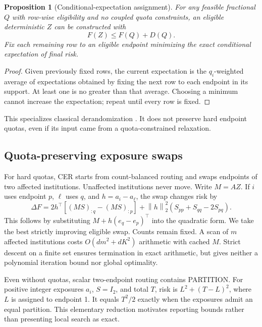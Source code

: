 \documentclass[11pt]{article}
\newtheorem{proposition}[theorem]{Proposition}
\newcommand{\norm}[1]{\left\lVert#1\right\rVert}
\begin{document}
\begin{proposition}[Conditional-expectation assignment]\label{prop:round}
For any feasible fractional \(Q\) with row-wise eligibility and no coupled quota constraints, an eligible deterministic \(Z\) can be constructed with
\begin{equation}
 F(Z)\le F(Q)+D(Q).
 \label{eq:round}
\end{equation}
Fix each remaining row to an eligible endpoint minimizing the exact conditional expectation of final risk.
\end{proposition}
\begin{proof}
Given previously fixed rows, the current expectation is the \(q_i\)-weighted average of expectations obtained by fixing the next row to each endpoint in its support. At least one is no greater than that average. Choosing a minimum cannot increase the expectation; repeat until every row is fixed.
\end{proof}
This specializes classical derandomization \citep{raghavan1987}. It does not preserve hard endpoint quotas, even if its input came from a quota-constrained relaxation.

\subsection{Quota-preserving exposure swaps}
For hard quotas, CER starts from count-balanced routing and swaps endpoints of two affected institutions. Unaffected institutions never move. Write \(M=AZ\). If \(i\) uses endpoint \(p\), \(\ell\) uses \(q\), and \(h=a_i-a_\ell\), the swap changes risk by
\begin{equation}
 \Delta F =
 2h^\top[(MS)_{:q}-(MS)_{:p}]
 +\norm{h}_2^2(S_{pp}+S_{qq}-2S_{pq}).
 \label{eq:swap}
\end{equation}
This follows by substituting \(M+h(e_q-e_p)^\top\) into the quadratic form. We take the best strictly improving eligible swap. Counts remain fixed. A scan of \(m\) affected institutions costs \(O(dm^2+dK^2)\) arithmetic with cached \(M\). Strict descent on a finite set ensures termination in exact arithmetic, but gives neither a polynomial iteration bound nor global optimality.

Even without quotas, scalar two-endpoint routing contains PARTITION. For positive integer exposures \(a_i\), \(S=I_2\), and total \(T\), risk is \(L^2+(T-L)^2\), where \(L\) is assigned to endpoint 1. It equals \(T^2/2\) exactly when the exposures admit an equal partition. This elementary reduction motivates reporting bounds rather than presenting local search as exact.
\end{document}
